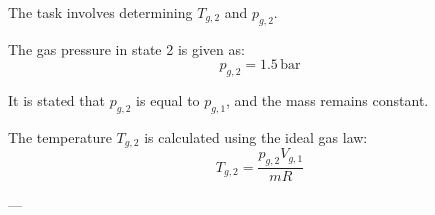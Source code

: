The task involves determining \( T_{g,2} \) and \( p_{g,2} \).  

The gas pressure in state 2 is given as:  
\[
p_{g,2} = 1.5 \, \text{bar}
\]  

It is stated that \( p_{g,2} \) is equal to \( p_{g,1} \), and the mass remains constant.  

The temperature \( T_{g,2} \) is calculated using the ideal gas law:  
\[
T_{g,2} = \frac{p_{g,2} V_{g,1}}{m R}
\]  

---